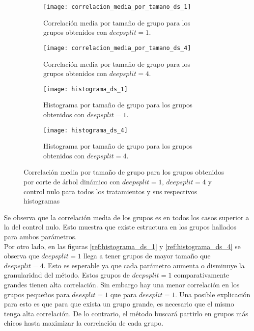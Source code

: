 \begin{figure*}[t!]
    \centering
    \begin{subfigure}[t]{0.45\textwidth}
    \centering
    \texttt{[image: correlacion\_media\_por\_tamano\_ds\_1]}
    \caption{Correlación media por tamaño de grupo para los grupos obtenidos con $deepsplit=1$.}
    \label{fig:correlacion_media_por_tamano_ds_1}
    \end{subfigure}
    \begin{subfigure}[t]{0.45\textwidth}
    \centering
    \texttt{[image: correlacion\_media\_por\_tamano\_ds\_4]}
    \caption{Correlación media por tamaño de grupo para los grupos obtenidos con $deepsplit=4$.}
    \label{fig:correlacion_media_por_tamano_ds_4}
    \end{subfigure}
    \centering
    \begin{subfigure}[t]{0.45\textwidth}
    \centering
    \texttt{[image: histograma\_ds\_1]}
    \caption{Histograma por tamaño de grupo para los grupos obtenidos con $deepsplit=1$.}
    \label{fig:histograma_ds_1}
    \end{subfigure}
    \begin{subfigure}[t]{0.45\textwidth}
    \centering
    \texttt{[image: histograma\_ds\_4]}
    \caption{Histograma por tamaño de grupo para los grupos obtenidos con $deepsplit=4$.}
    \label{fig:histograma_ds_4}
    \end{subfigure}    
    \caption{Correlación media por tamaño de grupo para los grupos obtenidos por corte de árbol dinámico con $deepsplit=1$, $deepsplit=4$ y control nulo para todos los tratamientos y sus respectivos histogramas}
\end{figure*}
Se observa que la correlación media de los grupos es en todos los casos superior a la del control nulo. Esto muestra que existe estructura en los grupos hallados para ambos parámetros. \\
Por otro lado, en las figuras \ref{ref:histograma_ds_1} y \ref{ref:histograma_ds_4} se observa que $deepsplit=1$ llega a tener grupos de mayor tamaño que $deepsplit=4$. Esto es esperable ya que cada parámetro aumenta o disminuye la granularidad del método. Estos grupos de $deepsplit=1$ comparativamente grandes tienen alta correlación. Sin embargo hay una menor correlación en los grupos pequeños para $deesplit=1$ que para $deesplit=1$. Una posible explicación para esto es que para que exista un grupo grande, es necesario que el mismo tenga alta correlación. De lo contrario, el método buscará partirlo en grupos más chicos hasta maximizar la correlación de cada grupo.\\
